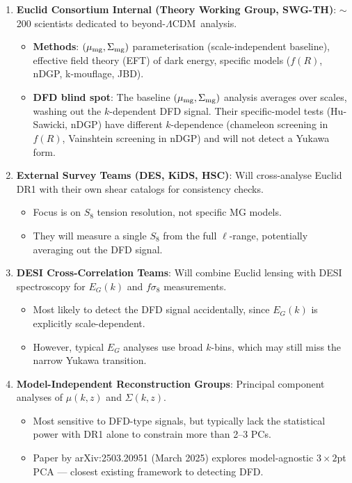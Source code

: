 \documentclass[11pt,a4paper]{article}
\newcommand{\LCDM}{$\Lambda$CDM}
\begin{document}
\begin{enumerate}[label=\textbf{\arabic*.}]

\item \textbf{Euclid Consortium Internal (Theory Working Group, SWG-TH)}:
  $\sim$200 scientists dedicated to beyond-\LCDM\ analysis.
  \begin{itemize}[nosep]
  \item \textbf{Methods}: $(\mu_{\rm mg}, \Sigma_{\rm mg})$
    parameterisation (scale-independent baseline), effective field
    theory (EFT) of dark energy, specific models ($f(R)$, nDGP,
    k-mouflage, JBD).
  \item \textbf{DFD blind spot}: The baseline $(\mu_{\rm mg},
    \Sigma_{\rm mg})$ analysis averages over scales, washing out the
    $k$-dependent DFD signal. Their specific-model tests (Hu-Sawicki,
    nDGP) have different $k$-dependence (chameleon screening in $f(R)$,
    Vainshtein screening in nDGP) and will not detect a Yukawa form.
  \end{itemize}

\item \textbf{External Survey Teams (DES, KiDS, HSC)}:
  Will cross-analyse Euclid DR1 with their own shear catalogs for
  consistency checks.
  \begin{itemize}[nosep]
  \item Focus is on $S_8$ tension resolution, not specific MG models.
  \item They will measure a single $S_8$ from the full $\ell$-range,
    potentially averaging out the DFD signal.
  \end{itemize}

\item \textbf{DESI Cross-Correlation Teams}:
  Will combine Euclid lensing with DESI spectroscopy for $E_G(k)$ and
  $f\sigma_8$ measurements.
  \begin{itemize}[nosep]
  \item Most likely to detect the DFD signal accidentally, since
    $E_G(k)$ is explicitly scale-dependent.
  \item However, typical $E_G$ analyses use broad $k$-bins, which may
    still miss the narrow Yukawa transition.
  \end{itemize}

\item \textbf{Model-Independent Reconstruction Groups}:
  Principal component analyses of $\mu(k,z)$ and $\Sigma(k,z)$.
  \begin{itemize}[nosep]
  \item Most sensitive to DFD-type signals, but typically lack the
    statistical power with DR1 alone to constrain more than 2--3 PCs.
  \item Paper by arXiv:2503.20951 (March 2025) explores model-agnostic
    $3\times 2$pt PCA --- closest existing framework to detecting DFD.
  \end{itemize}

\end{enumerate}
\end{document}
